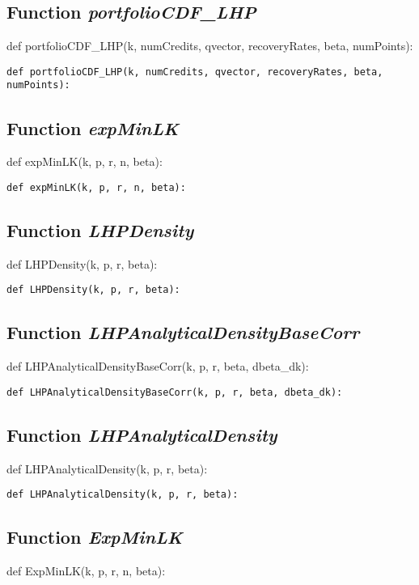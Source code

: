 \documentclass[twoside,11pt]{book}
\begin{document}
\subsection{Function {\it portfolioCDF\_LHP}}
def portfolioCDF\_LHP(k, numCredits, qvector, recoveryRates, beta, numPoints):

\begin{lstlisting}
def portfolioCDF_LHP(k, numCredits, qvector, recoveryRates, beta, numPoints):
\end{lstlisting}

\subsection{Function {\it expMinLK}}
def expMinLK(k, p, r, n, beta):

\begin{lstlisting}
def expMinLK(k, p, r, n, beta):
\end{lstlisting}

\subsection{Function {\it LHPDensity}}
def LHPDensity(k, p, r, beta):

\begin{lstlisting}
def LHPDensity(k, p, r, beta):
\end{lstlisting}

\subsection{Function {\it LHPAnalyticalDensityBaseCorr}}
def LHPAnalyticalDensityBaseCorr(k, p, r, beta, dbeta\_dk):

\begin{lstlisting}
def LHPAnalyticalDensityBaseCorr(k, p, r, beta, dbeta_dk):
\end{lstlisting}

\subsection{Function {\it LHPAnalyticalDensity}}
def LHPAnalyticalDensity(k, p, r, beta):

\begin{lstlisting}
def LHPAnalyticalDensity(k, p, r, beta):
\end{lstlisting}

\subsection{Function {\it ExpMinLK}}
def ExpMinLK(k, p, r, n, beta):
\end{document}
